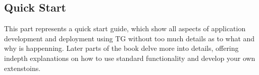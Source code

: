 \begin{partbacktext}
\part{Quick Start}  
  This part represents a quick start guide, which show all aspects of application development and deployment using TG without too much details as to what and why is happenning.
  Later parts of the book delve more into details, offering indepth explanations on how to use standard functionality and develop your own extenstoins.
\end{partbacktext}
